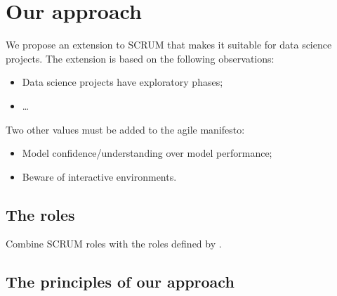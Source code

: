 \section{Our approach}

We propose an extension to SCRUM that makes it suitable for data science projects.  The
extension is based on the following observations:
\begin{itemize}
  \item Data science projects have exploratory phases;
  \item \dots
\end{itemize}

Two other values must be added to the agile manifesto:
\begin{itemize}
  \item Model confidence/understanding over model performance;
  \item Beware of interactive environments.
\end{itemize}

\subsection{The roles}

Combine SCRUM roles with the roles defined by \textcite{Zumel2019}.

\subsection{The principles of our approach}

